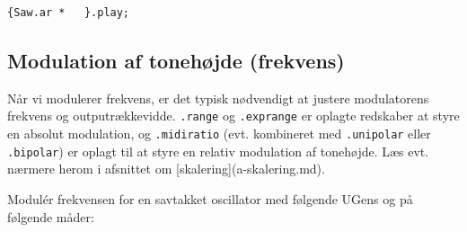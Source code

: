 \begin{listing}[H]
\begin{verbatim}
{Saw.ar *   }.play;
\end{verbatim}
\caption{Amplitudemodulation med LFO}
\end{listing}
\subsection{Modulation af tonehøjde (frekvens)}

Når vi modulerer frekvens, er det typisk nødvendigt at justere modulatorens frekvens og outputrækkevidde. \texttt{.range} og \texttt{.exprange} er oplagte redskaber at styre en absolut modulation, og \texttt{.midiratio} (evt. kombineret med \texttt{.unipolar} eller \texttt{.bipolar}) er oplagt til at styre en relativ modulation af tonehøjde. Læs evt. nærmere herom i afsnittet om [skalering](a-skalering.md).

Modulér frekvensen for en savtakket oscillator med følgende UGens og på følgende måder:

